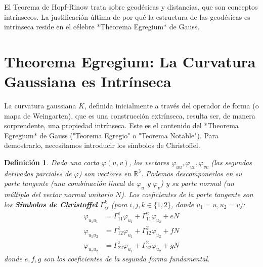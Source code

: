 \documentclass[12pt, a4paper]{report}
\theoremstyle{miestilo}
\theoremstyle{midefinicion}
\newtheorem{definicion}[teorema]{Definición}
\begin{document}
El Teorema de Hopf-Rinow trata sobre geodésicas y distancias, que son conceptos intrínsecos. La justificación última de por qué la estructura de las geodésicas es intrínseca reside en el célebre *Theorema Egregium* de Gauss.

\section{Theorema Egregium: La Curvatura Gaussiana es Intrínseca}

La curvatura gaussiana $K$, definida inicialmente a través del operador de forma (o mapa de Weingarten), que es una construcción extrínseca, resulta ser, de manera sorprendente, una propiedad intrínseca. Este es el contenido del *Theorema Egregium* de Gauss ("Teorema Egregio" o "Teorema Notable"). Para demostrarlo, necesitamos introducir los símbolos de Christoffel.

\begin{definicion}
Dada una carta $\varphi(u,v)$, los vectores $\varphi_{uu}, \varphi_{uv}, \varphi_{vv}$ (las segundas derivadas parciales de $\varphi$) son vectores en $\mathbb{R}^3$. Podemos descomponerlos en su parte tangente (una combinación lineal de $\varphi_u$ y $\varphi_v$) y su parte normal (un múltiplo del vector normal unitario $N$). Los coeficientes de la parte tangente son los \textbf{Símbolos de Christoffel} $\Gamma_{ij}^k$ (para $i,j,k \in \{1,2\}$, donde $u_1=u, u_2=v$):
\begin{align*}
\varphi_{u_1 u_1} &= \Gamma_{11}^1 \varphi_{u_1} + \Gamma_{11}^2 \varphi_{u_2} + e N \\
\varphi_{u_1 u_2} &= \Gamma_{12}^1 \varphi_{u_1} + \Gamma_{12}^2 \varphi_{u_2} + f N \\
\varphi_{u_2 u_2} &= \Gamma_{22}^1 \varphi_{u_1} + \Gamma_{22}^2 \varphi_{u_2} + g N
\end{align*}
donde $e, f, g$ son los coeficientes de la segunda forma fundamental.
\end{definicion}
\end{document}
